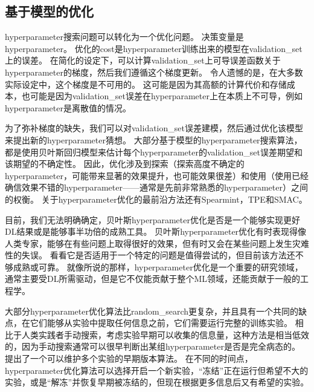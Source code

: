 
\subsection{基于模型的优化}
\label{sec:model_based_hyperparameter_optimization}
\gls{hyperparameter}搜索问题可以转化为一个优化问题。
决策变量是\gls{hyperparameter}。
优化的\gls{cost}是\gls{hyperparameter}训练出来的模型在\gls{validation_set}上的误差。
在简化的设定下，可以计算\gls{validation_set}上可导误差函数关于\gls{hyperparameter}的梯度，然后我们遵循这个梯度更新\citep{bengio:1999:snowbird,bengio-hyper-NC00,maclaurin2015gradient}。
令人遗憾的是，在大多数实际设定中，这个梯度是不可用的。
这可能是因为其高额的计算代价和存储成本，也可能是因为\gls{validation_set}误差在\gls{hyperparameter}上在本质上不可导，例如\gls{hyperparameter}是离散值的情况。


为了弥补梯度的缺失，我们可以对\gls{validation_set}误差建模，然后通过优化该模型来提出新的\gls{hyperparameter}猜想。
大部分基于模型的\gls{hyperparameter}搜索算法，都是使用贝叶斯回归模型来估计每个\gls{hyperparameter}的\gls{validation_set}误差期望和该期望的不确定性。
因此，优化涉及到探索（探索高度不确定的\gls{hyperparameter}，可能带来显著的效果提升，也可能效果很差）和使用（使用已经确信效果不错的\gls{hyperparameter}——通常是先前非常熟悉的\gls{hyperparameter}）之间的权衡。%
关于\gls{hyperparameter}优化的最前沿方法还有Spearmint\citep{Snoek+al-NIPS2012-small}，TPE\citep{Bergstra+al-NIPS2011}和SMAC\citep{hutter+hoos+leyton+brown:2011}。


目前，我们无法明确确定，贝叶斯\gls{hyperparameter}优化是否是一个能够实现更好\gls{DL}结果或是能够事半功倍的成熟工具。
贝叶斯\gls{hyperparameter}优化有时表现得像人类专家，能够在有些问题上取得很好的效果，但有时又会在某些问题上发生灾难性的失误。
看看它是否适用于一个特定的问题是值得尝试的，但目前该方法还不够成熟或可靠。
就像所说的那样，\gls{hyperparameter}优化是一个重要的研究领域，通常主要受\gls{DL}所需驱动，但是它不仅能贡献于整个\gls{ML}领域，还能贡献于一般的工程学。


大部分\gls{hyperparameter}优化算法比\gls{random_search}更复杂，并且具有一个共同的缺点，在它们能够从实验中提取任何信息之前，它们需要运行完整的训练实验。
相比于人类实践者手动搜索，考虑实验早期可以收集的信息量，这种方法是相当低效的，因为手动搜索通常可以很早判断出某组\gls{hyperparameter}是否是完全病态的。
\cite{swersky2014freeze}提出了一个可以维护多个实验的早期版本算法。
在不同的时间点，\gls{hyperparameter}优化算法可以选择开启一个新实验，``冻结''正在运行但希望不大的实验，或是``解冻''并恢复早期被冻结的，但现在根据更多信息后又有希望的实验。


